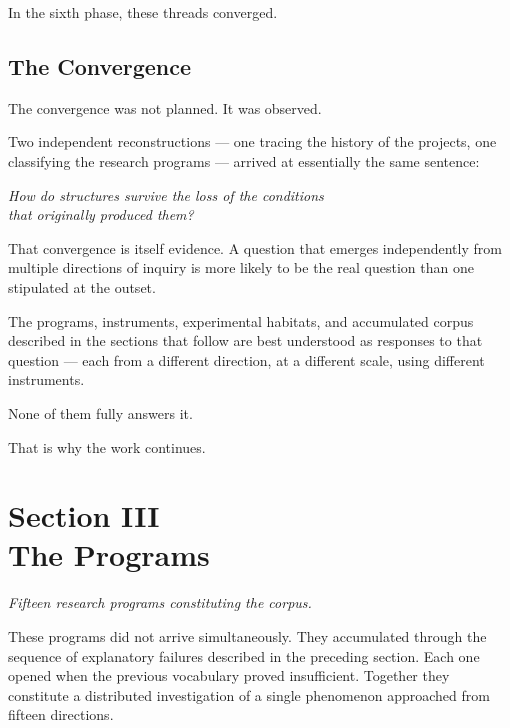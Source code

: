 \documentclass[12pt, openany]{book}
\begin{document}
In the sixth phase, these threads converged.

\section{The Convergence}

The convergence was not planned. It was observed.

Two independent reconstructions — one tracing the history of the projects,
one classifying the research programs — arrived at essentially the same
sentence:

\bigskip
\begin{center}
\textit{How do structures survive the loss of the conditions\\
that originally produced them?}
\end{center}
\bigskip

That convergence is itself evidence. A question that emerges independently
from multiple directions of inquiry is more likely to be the real question
than one stipulated at the outset.

The programs, instruments, experimental habitats, and accumulated corpus
described in the sections that follow are best understood as responses to
that question — each from a different direction, at a different scale,
using different instruments.

None of them fully answers it.

That is why the work continues.

\cleardoublepage

\chapter[The Programs]{Section III \\ The Programs}

\noindent\textit{Fifteen research programs constituting the corpus.}

\bigskip

\noindent These programs did not arrive simultaneously. They accumulated
through the sequence of explanatory failures described in the preceding
section. Each one opened when the previous vocabulary proved insufficient.
Together they constitute a distributed investigation of a single phenomenon
approached from fifteen directions.
\end{document}
